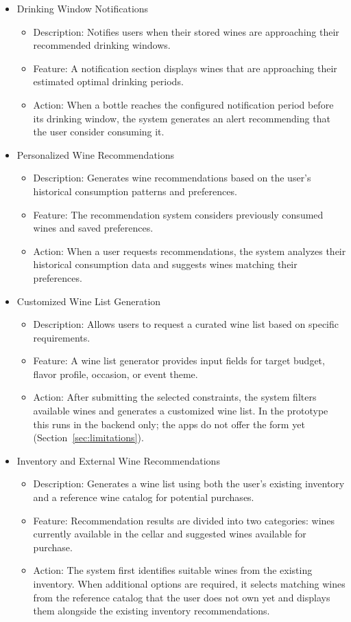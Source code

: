 \documentclass[conference]{IEEEtran}
\begin{document}
\begin{itemize}
    \item Drinking Window Notifications
    \begin{itemize}
        \item Description: Notifies users when their stored wines are approaching their recommended drinking windows.
        \item Feature: A notification section displays wines that are approaching their estimated optimal drinking periods.
        \item Action: When a bottle reaches the configured notification period before its drinking window, the system generates an alert recommending that the user consider consuming it.
    \end{itemize}

    \item Personalized Wine Recommendations
    \begin{itemize}
        \item Description: Generates wine recommendations based on the user's historical consumption patterns and preferences.
        \item Feature: The recommendation system considers previously consumed wines and saved preferences.
        \item Action: When a user requests recommendations, the system analyzes their historical consumption data and suggests wines matching their preferences.
    \end{itemize}

    \item Customized Wine List Generation
    \begin{itemize}
        \item Description: Allows users to request a curated wine list based on specific requirements.
        \item Feature: A wine list generator provides input fields for target budget, flavor profile, occasion, or event theme.
        \item Action: After submitting the selected constraints, the system filters available wines and generates a customized wine list. In the prototype this runs in the backend only; the apps do not offer the form yet (Section~\ref{sec:limitations}).
    \end{itemize}

    \item Inventory and External Wine Recommendations
    \begin{itemize}
        \item Description: Generates a wine list using both the user's existing inventory and a reference wine catalog for potential purchases.
        \item Feature: Recommendation results are divided into two categories: wines currently available in the cellar and suggested wines available for purchase.
        \item Action: The system first identifies suitable wines from the existing inventory. When additional options are required, it selects matching wines from the reference catalog that the user does not own yet and displays them alongside the existing inventory recommendations.
    \end{itemize}


\end{itemize}
\end{document}
